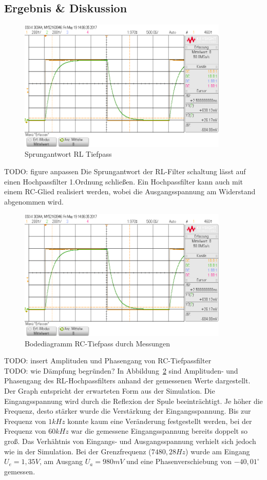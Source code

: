 \documentclass[12pt,a4paper,titlepage]{article}
\begin{document}
\subsection{Ergebnis \& Diskussion}
\begin{figure}[H]
  \centering
  \includegraphics[width=100mm]{sprungantwort_rc_tiefpass.png}
  \caption{Sprungantwort RL Tiefpass}
  \label{Figure06}
\end{figure}
TODO: figure anpassen
\noindent Die Sprungantwort der RL-Filter schaltung l\"asst auf einen Hochpassfilter 1.Ordnung schlie\ss en. Ein Hochpassfilter kann auch mit einem RC-Glied realisiert werden, wobei die Ausgangsspannung am Widerstand abgenommen wird.

\begin{figure}[H]
  \centering
  \includegraphics[width=100mm]{sprungantwort_rc_tiefpass.png}
  \caption{Bodediagramm RC-Tiefpass durch Messungen}
  \label{Figure07}
\end{figure}
TODO: insert Amplituden und Phasengang von RC-Tiefpassfilter \\
TODO: wie Dämpfung begründen?
In Abbildung~\ref{Figure07} sind Amplituden- und Phasengang des RL-Hochpassfilters anhand der gemessenen Werte dargestellt. Der Graph entspricht der erwarteten Form aus der Simulation. Die Eingangsspannung wird durch die Reflexion der Spule beeintr\"achtigt. Je h\"oher die Frequenz, desto st\"arker wurde die Verst\"arkung der Eingangsspannung. Bis zur Frequenz von $1 kHz$ konnte kaum eine Ver\"anderung festgestellt werden, bei der Frequenz von $60 kHz$ war die gemessene Eingangsspannung bereits doppelt so gro\ss. Das Verh\"ahtnis von Eingangs- und Ausgangsspannung verhielt sich jedoch wie in der Simulation. Bei der Grenzfrequenz ($7480, 28Hz$) wurde am Eingang $U_e = 1,35V$, am Ausgang $U_a = 980mV$ und eine Phasenverschiebung von $-40,01^{\circ}$ gemessen.
\end{document}
